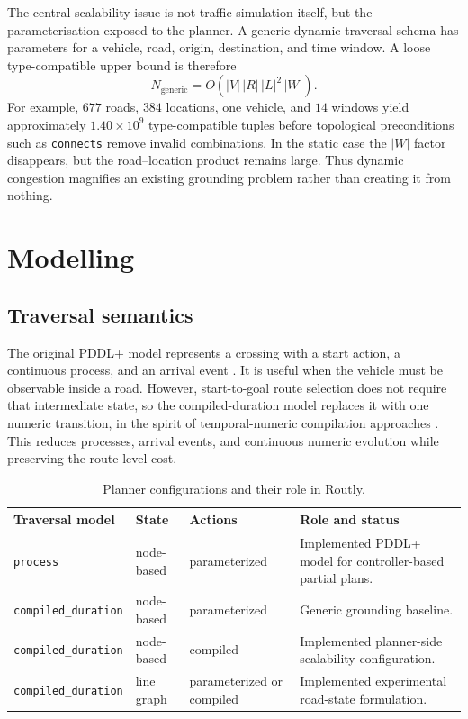 \documentclass[10pt]{article}
\begin{document}
The central scalability issue is not traffic simulation itself, but the
parameterisation exposed to the planner. A generic dynamic traversal schema has
parameters for a vehicle, road, origin, destination, and time window. A loose
type-compatible upper bound is therefore
\[
  N_{\mathrm{generic}} = O\!\left(|V|\,|R|\,|L|^2\,|W|\right).
\]
For example, $677$ roads, $384$ locations, one vehicle, and $14$ windows yield
approximately $1.40\times10^9$ type-compatible tuples before topological
preconditions such as \texttt{connects} remove invalid combinations. In the
static case the $|W|$ factor disappears, but the road--location product remains
large. Thus dynamic congestion magnifies an existing grounding problem rather
than creating it from nothing.

\section{Modelling}
\subsection{Traversal semantics}
The original PDDL+ model represents a crossing with a start action, a continuous
process, and an arrival event \cite{fox2006,coles2012}. It is useful when the vehicle must be observable
inside a road. However, start-to-goal route selection does not require that
intermediate state, so the compiled-duration model replaces it with one numeric
transition, in the spirit of temporal-numeric compilation approaches
\cite{micheli2026}. This reduces processes, arrival events, and continuous numeric
evolution while preserving the route-level cost.

\begin{table}[t]
\centering
\caption{Planner configurations and their role in Routly.}
\label{tab:planner-configurations}
\small
\begin{tabularx}{\linewidth}{@{}l l l Y@{}}
\toprule
Traversal model & State & Actions & Role and status \\
\midrule
\texttt{process} & node-based & parameterized & Implemented PDDL+ model for controller-based partial plans. \\
\texttt{compiled\_duration} & node-based & parameterized & Generic grounding baseline. \\
\texttt{compiled\_duration} & node-based & compiled & Implemented planner-side scalability configuration. \\
\texttt{compiled\_duration} & line graph & parameterized or compiled & Implemented experimental road-state formulation. \\
\bottomrule
\end{tabularx}
\end{table}
\end{document}
